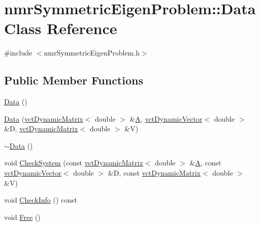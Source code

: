 \hypertarget{classnmr_symmetric_eigen_problem_1_1_data}{\section{nmr\-Symmetric\-Eigen\-Problem\-:\-:Data Class Reference}
\label{classnmr_symmetric_eigen_problem_1_1_data}
}


{\ttfamily \#include $<$nmr\-Symmetric\-Eigen\-Problem.\-h$>$}

\subsection*{Public Member Functions}
\begin{DoxyCompactItemize}
\item 
\hyperlink{classnmr_symmetric_eigen_problem_1_1_data_ab47d7e5d47a9f6a75f463c1af12c0719}{Data} ()
\item 
\hyperlink{classnmr_symmetric_eigen_problem_1_1_data_a3e60769966b903dbba7934c535393b1f}{Data} (\hyperlink{classvct_dynamic_matrix}{vct\-Dynamic\-Matrix}$<$ double $>$ \&\hyperlink{classnmr_symmetric_eigen_problem_1_1_data_aa45f414eef4fb85b15868757aa728448}{A}, \hyperlink{classvct_dynamic_vector}{vct\-Dynamic\-Vector}$<$ double $>$ \&D, \hyperlink{classvct_dynamic_matrix}{vct\-Dynamic\-Matrix}$<$ double $>$ \&V)
\item 
\hyperlink{classnmr_symmetric_eigen_problem_1_1_data_a4f96b51dba64f2160c5a0362620b009d}{$\sim$\-Data} ()
\item 
void \hyperlink{classnmr_symmetric_eigen_problem_1_1_data_a555f17d5c94a1f7c4068160b5ca4d7f0}{Check\-System} (const \hyperlink{classvct_dynamic_matrix}{vct\-Dynamic\-Matrix}$<$ double $>$ \&\hyperlink{classnmr_symmetric_eigen_problem_1_1_data_aa45f414eef4fb85b15868757aa728448}{A}, const \hyperlink{classvct_dynamic_vector}{vct\-Dynamic\-Vector}$<$ double $>$ \&D, const \hyperlink{classvct_dynamic_matrix}{vct\-Dynamic\-Matrix}$<$ double $>$ \&V)
\item 
void \hyperlink{classnmr_symmetric_eigen_problem_1_1_data_a033b1e23dd6b104573c14bc441b15c4d}{Check\-Info} () const 
\item 
void \hyperlink{classnmr_symmetric_eigen_problem_1_1_data_a388d72081578e7e61438c33de468e359}{Free} ()
\end{DoxyCompactItemize}
